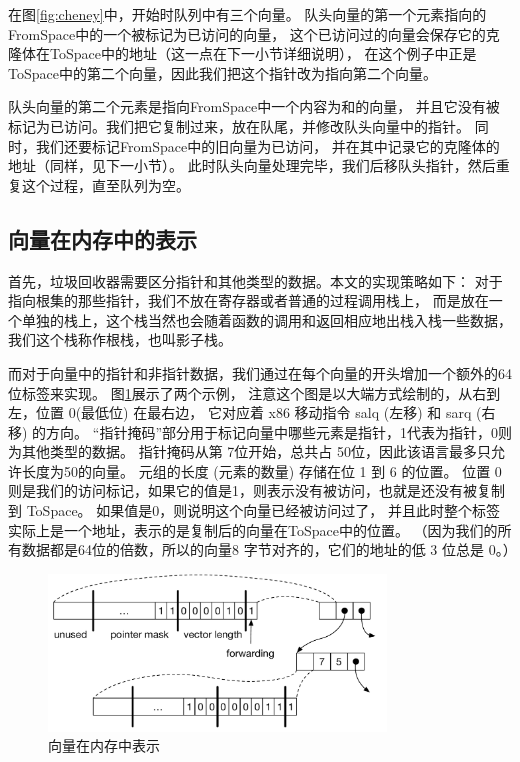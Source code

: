 在图\ref{fig:cheney}中，开始时队列中有三个向量。
队头向量的第一个元素指向的FromSpace中的一个被标记为已访问的向量，
这个已访问过的向量会保存它的克隆体在ToSpace中的地址（这一点在下一小节详细说明），
在这个例子中正是ToSpace中的第二个向量，因此我们把这个指针改为指向第二个向量。

队头向量的第二个元素是指向FromSpace中一个内容为和的向量，
并且它没有被标记为已访问。我们把它复制过来，放在队尾，并修改队头向量中的指针。
同时，我们还要标记FromSpace中的旧向量为已访问，
并在其中记录它的克隆体的地址（同样，见下一小节）。
此时队头向量处理完毕，我们后移队头指针，然后重复这个过程，直至队列为空。

\subsection{向量在内存中的表示}

首先，垃圾回收器需要区分指针和其他类型的数据。本文的实现策略如下：
对于指向根集的那些指针，我们不放在寄存器或者普通的过程调用栈上，
而是放在一个单独的栈上，这个栈当然也会随着函数的调用和返回相应地出栈入栈一些数据，
我们这个栈称作根栈，也叫影子栈。

而对于向量中的指针和非指针数据，我们通过在每个向量的开头增加一个额外的64位标签来实现。
图\ref{fig:tuple-rep}展示了两个示例，
注意这个图是以大端方式绘制的，从右到左，位置 0(最低位) 在最右边，
它对应着 x86 移动指令 salq (左移) 和 sarq (右移) 的方向。
“指针掩码”部分用于标记向量中哪些元素是指针，1代表为指针，0则为其他类型的数据。
指针掩码从第 7位开始，总共占 50位，因此该语言最多只允许长度为50的向量。
元组的长度 (元素的数量) 存储在位 1 到 6 的位置。
位置 0 则是我们的访问标记，如果它的值是1，则表示没有被访问，也就是还没有被复制到 ToSpace。
如果值是0，则说明这个向量已经被访问过了，
并且此时整个标签实际上是一个地址，表示的是复制后的向量在ToSpace中的位置。
（因为我们的所有数据都是64位的倍数，所以的向量8 字节对齐的，它们的地址的低 3 位总是 0。）

\begin{figure}[t]
\centering
\includegraphics[width=0.8\textwidth]{figures/tuple-rep}
\caption{向量在内存中表示}
\label{fig:tuple-rep}
\end{figure}

